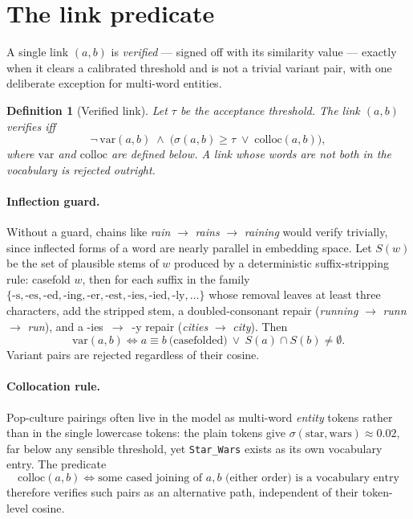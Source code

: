 \documentclass[11pt]{article}
\newtheorem{definition}{Definition}
\newcommand{\cosim}{\sigma}
\newcommand{\thresh}{\tau}
\begin{document}
\section{The link predicate}

A single link $(a, b)$ is \emph{verified} --- signed off with its similarity
value --- exactly when it clears a calibrated threshold and is not a trivial
variant pair, with one deliberate exception for multi-word entities.

\begin{definition}[Verified link]
\label{def:link}
Let $\thresh$ be the acceptance threshold. The link $(a,b)$ verifies iff
\[
  \neg\,\mathrm{var}(a, b)
  \;\wedge\;
  \bigl( \cosim(a, b) \ge \thresh \;\vee\; \mathrm{colloc}(a, b) \bigr),
\]
where $\mathrm{var}$ and $\mathrm{colloc}$ are defined below. A link whose
words are not both in the vocabulary is rejected outright.
\end{definition}

\paragraph{Inflection guard.}
Without a guard, chains like \emph{rain} $\to$ \emph{rains} $\to$
\emph{raining} would verify trivially, since inflected forms of a word are
nearly parallel in embedding space. Let $S(w)$ be the set of plausible stems of
$w$ produced by a deterministic suffix-stripping rule: casefold $w$, then for
each suffix in the family
$\{\text{-s}, \text{-es}, \text{-ed}, \text{-ing}, \text{-er}, \text{-est},
\text{-ies}, \text{-ied}, \text{-ly}, \dots\}$
whose removal leaves at least three characters, add the stripped stem, a
doubled-consonant repair (\emph{running} $\to$ \emph{runn} $\to$ \emph{run}),
and a \mbox{-ies $\to$ -y} repair (\emph{cities} $\to$ \emph{city}). Then
\[
  \mathrm{var}(a, b) \iff
  a \equiv b \ \text{(casefolded)} \ \vee\ S(a) \cap S(b) \neq \emptyset .
\]
Variant pairs are rejected regardless of their cosine.

\paragraph{Collocation rule.}
Pop-culture pairings often live in the model as multi-word \emph{entity}
tokens rather than in the single lowercase tokens: the plain tokens give
$\cosim(\text{star}, \text{wars}) \approx 0.02$, far below any sensible
threshold, yet \texttt{Star\_Wars} exists as its own vocabulary entry. The
predicate
\[
  \mathrm{colloc}(a, b) \iff
  \text{some cased joining of } a, b
  \text{ (either order) is a vocabulary entry}
\]
therefore verifies such pairs as an alternative path, independent of their
token-level cosine.
\end{document}
